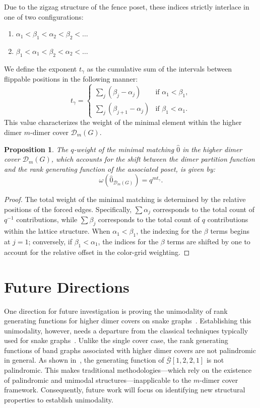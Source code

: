 \documentclass[11pt]{amsart}
\newtheorem{prop}[thm]{Proposition}
\theoremstyle{definition}
\theoremstyle{remark}
\numberwithin{equation}{section}
\begin{document}
Due to the zigzag structure of the fence poset, these indices strictly interlace in one of two configurations:
\begin{enumerate}
    \item $\alpha_1 < \beta_1 < \alpha_2 < \beta_2 < \dots$
    \item $\beta_1 < \alpha_1 < \beta_2 < \alpha_2 < \dots$
\end{enumerate}

We define the exponent $t_\gamma$ as the cumulative sum of the intervals between flippable positions in the following manner:
\[
    t_\gamma = 
    \begin{cases} 
    \sum_{j} (\beta_j - \alpha_j) & \text{if } \alpha_1 < \beta_1, \\
    \sum_{j} (\beta_{j+1} - \alpha_j) & \text{if } \beta_1 < \alpha_1.
    \end{cases}
\]
This value characterizes the weight of the minimal element within the higher dimer $m$-dimer cover $\mathcal{D}_m(G)$.

\begin{prop}
The $q$-weight of the minimal matching $\hat{0}$ in the higher dimer cover $\mathcal{D}_m(G)$, which accounts for the shift between the dimer partition function and the rank generating function of the associated poset, is given by:
\[ \omega(\hat{0}_{\mathcal{D}_m(G)}) = q^{mt_\gamma}. \]
\end{prop}

\begin{proof}
The total weight of the minimal matching is determined by the relative positions of the forced edges. Specifically, $\sum \alpha_j$ corresponds to the total count of $q^{-1}$ contributions, while $\sum \beta_j$ corresponds to the total count of $q$ contributions within the lattice structure. When $\alpha_1 < \beta_1$, the indexing for the $\beta$ terms begins at $j=1$; conversely, if $\beta_1 < \alpha_1$, the indices for the $\beta$ terms are shifted by one to account for the relative offset in the color-grid weighting.
\end{proof}


\section{Future Directions}\label{sec: future}

One direction for future investigation is proving the unimodality of rank generating functions for higher dimer covers on snake graphs~\cite{BOSZ26}. Establishing this unimodality, however, needs a departure from the classical techniques typically used for snake graphs~\cite{OR23}. Unlike the single cover case, the rank generating functions of band graphs associated with higher dimer covers are not palindromic in general. As shown in~, the generating function of $\overline{\mathcal{G}}[1,2,2,1]$ is not palindromic. This makes traditional methodologies—which rely on the existence of palindromic and unimodal structures—inapplicable to the $m$-dimer cover framework. Consequently, future work will focus on identifying new structural properties to establish unimodality.
\end{document}
